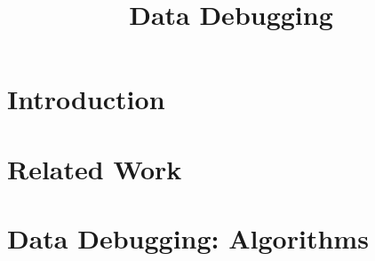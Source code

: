 \documentclass{sigplanconf}
\newcommand{\checkcell}{\textsc{CheckCell}}
\begin{document}
\copyrightdata{[to be supplied]} 



\title{Data Debugging}




\maketitle

\begin{abstract}

\end{abstract}




\section{Introduction}


\section{Related Work}
\label{sec:related}


\section{Data Debugging: Algorithms}
\label{sec:overview}


%
\end{document}
